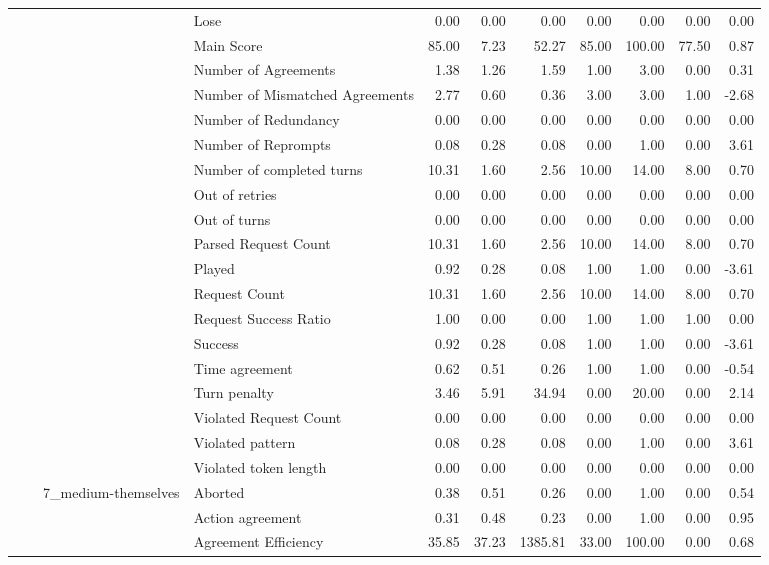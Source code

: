 \begin{tabular}{llllrrrrrrr}
 &  &  & Lose & 0.00 & 0.00 & 0.00 & 0.00 & 0.00 & 0.00 & 0.00 \\
 &  &  & Main Score & 85.00 & 7.23 & 52.27 & 85.00 & 100.00 & 77.50 & 0.87 \\
 &  &  & Number of Agreements & 1.38 & 1.26 & 1.59 & 1.00 & 3.00 & 0.00 & 0.31 \\
 &  &  & Number of Mismatched Agreements & 2.77 & 0.60 & 0.36 & 3.00 & 3.00 & 1.00 & -2.68 \\
 &  &  & Number of Redundancy & 0.00 & 0.00 & 0.00 & 0.00 & 0.00 & 0.00 & 0.00 \\
 &  &  & Number of Reprompts & 0.08 & 0.28 & 0.08 & 0.00 & 1.00 & 0.00 & 3.61 \\
 &  &  & Number of completed turns & 10.31 & 1.60 & 2.56 & 10.00 & 14.00 & 8.00 & 0.70 \\
 &  &  & Out of retries & 0.00 & 0.00 & 0.00 & 0.00 & 0.00 & 0.00 & 0.00 \\
 &  &  & Out of turns & 0.00 & 0.00 & 0.00 & 0.00 & 0.00 & 0.00 & 0.00 \\
 &  &  & Parsed Request Count & 10.31 & 1.60 & 2.56 & 10.00 & 14.00 & 8.00 & 0.70 \\
 &  &  & Played & 0.92 & 0.28 & 0.08 & 1.00 & 1.00 & 0.00 & -3.61 \\
 &  &  & Request Count & 10.31 & 1.60 & 2.56 & 10.00 & 14.00 & 8.00 & 0.70 \\
 &  &  & Request Success Ratio & 1.00 & 0.00 & 0.00 & 1.00 & 1.00 & 1.00 & 0.00 \\
 &  &  & Success & 0.92 & 0.28 & 0.08 & 1.00 & 1.00 & 0.00 & -3.61 \\
 &  &  & Time agreement & 0.62 & 0.51 & 0.26 & 1.00 & 1.00 & 0.00 & -0.54 \\
 &  &  & Turn penalty & 3.46 & 5.91 & 34.94 & 0.00 & 20.00 & 0.00 & 2.14 \\
 &  &  & Violated Request Count & 0.00 & 0.00 & 0.00 & 0.00 & 0.00 & 0.00 & 0.00 \\
 &  &  & Violated pattern & 0.08 & 0.28 & 0.08 & 0.00 & 1.00 & 0.00 & 3.61 \\
 &  &  & Violated token length & 0.00 & 0.00 & 0.00 & 0.00 & 0.00 & 0.00 & 0.00 \\
\cline{3-11}
 &  & \multirow[t]{27}{*}{7_medium-themselves} & Aborted & 0.38 & 0.51 & 0.26 & 0.00 & 1.00 & 0.00 & 0.54 \\
 &  &  & Action agreement & 0.31 & 0.48 & 0.23 & 0.00 & 1.00 & 0.00 & 0.95 \\
 &  &  & Agreement Efficiency & 35.85 & 37.23 & 1385.81 & 33.00 & 100.00 & 0.00 & 0.68 \\

\end{tabular}
